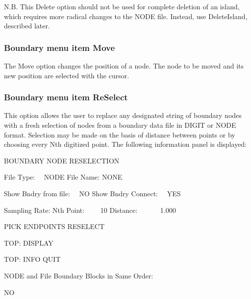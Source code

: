 \documentclass{article}
\begin{document}
N.B. This Delete option should not be used for complete deletion of an island, which requires more radical changes to the NODE file. Instead, use DeleteIsland, described later.

\subsubsection[Boundary menu item Move]{Boundary menu item Move}
The Move option changes the position of a node. The node to be moved and its new position are selected with the cursor.

\subsubsection[Boundary menu item ReSelect]{Boundary menu item ReSelect}
This option allows the user to replace any designated string of boundary nodes with a fresh selection of nodes from a boundary data file in DIGIT or NODE format. Selection may be made on the basis of distance between points or by choosing every Nth digitized point. The following information panel is displayed:

BOUNDARY NODE\newline
RESELECTION


\bigskip

File Type: \ \ NODE\newline
File Name:\newline
NONE \newline

Show Bndry from file: \ \ NO\newline
Show Bndry Connect: \ \ YES

Sampling Rate:\newline
Nth Point: \ \ \ \ 10\newline
Distance: \ \  \ \ \ \ 1.000

PICK ENDPOINTS\newline
RESELECT 

TOP: DISPLAY

TOP: INFO\newline
QUIT


\bigskip

NODE and File Boundary Blocks in Same Order:

NO
\end{document}
